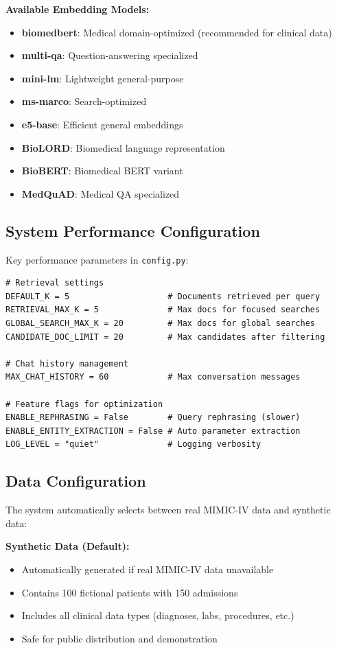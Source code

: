 \textbf{Available Embedding Models:}
\begin{itemize}
    \item \textbf{biomedbert}: Medical domain-optimized (recommended for clinical data)
    \item \textbf{multi-qa}: Question-answering specialized
    \item \textbf{mini-lm}: Lightweight general-purpose
    \item \textbf{ms-marco}: Search-optimized
    \item \textbf{e5-base}: Efficient general embeddings
    \item \textbf{BioLORD}: Biomedical language representation
    \item \textbf{BioBERT}: Biomedical BERT variant
    \item \textbf{MedQuAD}: Medical QA specialized
\end{itemize}

\subsection{System Performance Configuration}

Key performance parameters in \texttt{config.py}:

\begin{verbatim}
# Retrieval settings
DEFAULT_K = 5                    # Documents retrieved per query
RETRIEVAL_MAX_K = 5              # Max docs for focused searches
GLOBAL_SEARCH_MAX_K = 20         # Max docs for global searches
CANDIDATE_DOC_LIMIT = 20         # Max candidates after filtering

# Chat history management
MAX_CHAT_HISTORY = 60            # Max conversation messages

# Feature flags for optimization
ENABLE_REPHRASING = False        # Query rephrasing (slower)
ENABLE_ENTITY_EXTRACTION = False # Auto parameter extraction
LOG_LEVEL = "quiet"              # Logging verbosity
\end{verbatim}

\subsection{Data Configuration}

The system automatically selects between real MIMIC-IV data and synthetic data:

\textbf{Synthetic Data (Default):}
\begin{itemize}
    \item Automatically generated if real MIMIC-IV data unavailable
    \item Contains 100 fictional patients with 150 admissions
    \item Includes all clinical data types (diagnoses, labs, procedures, etc.)
    \item Safe for public distribution and demonstration
\end{itemize}

